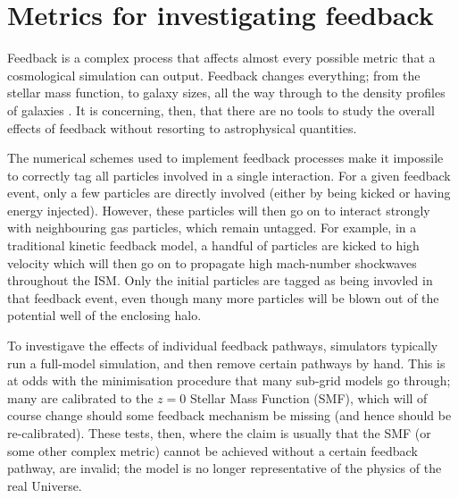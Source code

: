 \section{Metrics for investigating feedback}
\label{sec:feedbackmetrics}

Feedback is a complex process that affects almost every possible metric that a
cosmological simulation can output. Feedback changes everything; from the
stellar mass function, to galaxy sizes, all the way through to the density
profiles of galaxies \citep[e.g. ][]{BenitezLlambay2018}. It is concerning, then, that
there are no tools to study the overall effects of feedback without resorting
to astrophysical quantities.

The numerical schemes used to implement feedback processes make it impossile
to correctly tag all particles involved in a single interaction. For a given
feedback event, only a few particles are directly involved (either by being
kicked or having energy injected). However, these particles will then go on to
interact strongly with neighbouring gas particles, which remain untagged. For
example, in a traditional kinetic feedback model, a handful of particles are
kicked to high velocity which will then go on to propagate high mach-number
shockwaves throughout the ISM. Only the initial particles are tagged as being
invovled in that feedback event, even though many more particles will be blown
out of the potential well of the enclosing halo.

To investigave the effects of individual feedback pathways, simulators
typically run a full-model simulation, and then remove certain pathways by
hand. This is at odds with the minimisation procedure that many sub-grid
models go through; many are calibrated to the $z=0$ Stellar Mass Function
(SMF), which will of course change should some feedback mechanism be missing
(and hence should be re-calibrated). These tests, then, where the claim is
usually that the SMF (or some other complex metric) cannot be achieved without
a certain feedback pathway, are invalid; the model is no longer representative
of the physics of the real Universe.


